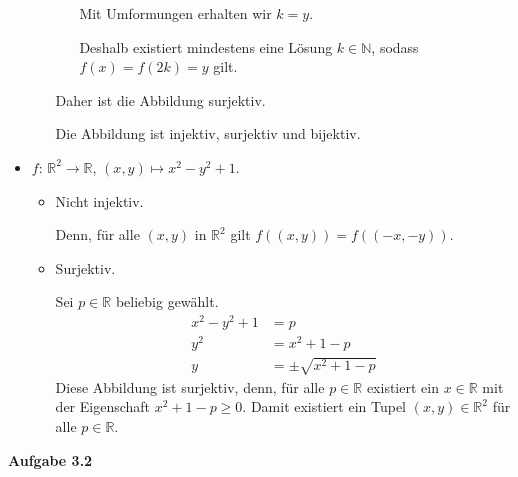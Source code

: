 \documentclass[12pt]{extarticle}
\begin{document}
\begin{itemize}
\begin{itemize}
\begin{itemize}
      Mit Umformungen erhalten wir \(k=y\).

      Deshalb existiert mindestens eine Lösung \(k \in \mathbb{N}\),
      sodass \(f(x)=f(2k)=y\) gilt.
    \end{itemize}
    Daher ist die Abbildung surjektiv.

    Die Abbildung ist injektiv, surjektiv und bijektiv.
  \end{itemize}

\item \(f\): \(\mathbb{R}^2 \rightarrow \mathbb{R}\), $(x,y) \mapsto
  x^2-y^2+1$.

  \begin{itemize}
  \item Nicht injektiv.

    Denn, für alle \((x,y)\) in \(\mathbb{R}^2\) gilt $f
    \left( (x,y) \right) = f \left( (-x,-y) \right)$.
  \item Surjektiv.

    Sei \(p \in \mathbb{R}\) beliebig gewählt.
\begin{align*}
  x^2-y^2+1&=p\\
  y^2&=x^2+1-p\\
  y&=\pm \sqrt{x^2+1-p}
\end{align*}
Diese Abbildung ist surjektiv, denn, für alle \(p \in \mathbb{R}\)
existiert ein \(x \in \mathbb{R}\) mit der Eigenschaft \(x^2+1-p \geq 0\).
Damit existiert ein Tupel \((x,y) \in \mathbb{R}^2\) für alle \(p \in \mathbb{R}\).
  \end{itemize}
\end{itemize}

\textbf{Aufgabe 3.2}
\end{document}
